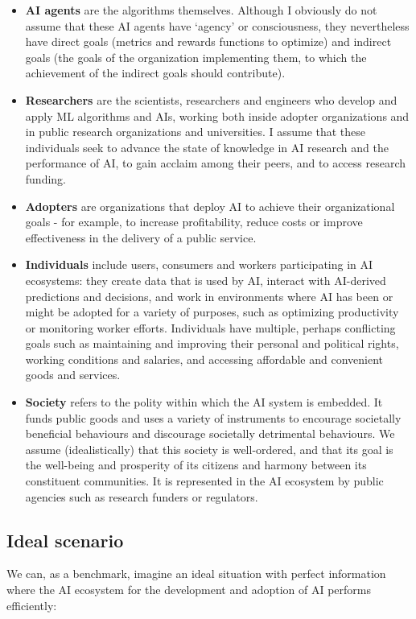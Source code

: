 \documentclass[11pt]{article}
\begin{document}
\begin{itemize}
    \item \textbf{AI agents} are the algorithms themselves. Although I obviously do not assume that these AI agents have `agency' or consciousness, they nevertheless have direct goals (metrics and rewards functions to optimize) and indirect goals (the goals of the organization implementing them, to which the achievement of the indirect goals should contribute).
    \item \textbf{Researchers} are the scientists, researchers and engineers who develop and apply ML algorithms and AIs, working both inside adopter organizations and in public research organizations and universities. I assume that these individuals seek to advance the state of knowledge in AI research and the performance of AI, to gain acclaim among their peers, and to access research funding.
    \item \textbf{Adopters} are organizations that deploy AI to achieve their organizational goals - for example, to increase profitability, reduce costs or improve effectiveness in the delivery of a public service.
    \item \textbf{Individuals} include users, consumers and workers participating in AI ecosystems: they create data that is used by AI, interact with AI-derived predictions and decisions, and work in environments where AI has been or might be adopted for a variety of purposes, such as optimizing productivity or monitoring worker efforts. Individuals have multiple, perhaps conflicting goals such as maintaining and improving their personal and political rights, working conditions and salaries, and accessing affordable and convenient goods and services.
    \item \textbf{Society} refers to the polity within which the AI system is embedded. It funds public goods and uses a variety of instruments to encourage societally beneficial behaviours and discourage societally detrimental behaviours. We assume (idealistically) that this society is well-ordered, and that its goal is the well-being and prosperity of its citizens and harmony between its constituent communities. It is represented in the AI ecosystem by public agencies such as research funders or regulators. 
\end{itemize}

\subsection{Ideal scenario}
We can, as a benchmark, imagine an ideal situation with perfect information where the AI ecosystem for the development and adoption of AI performs efficiently: 
\end{document}
